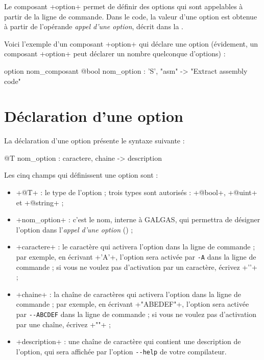 


Le composant \ggs+option+ permet de définir des options qui sont appelables à partir de la ligne de commande. Dans le code, la valeur d'une option est obtenue à partir de l'opérande \emph{appel d'une option}, décrit dans la .

Voici l'exemple d'un composant \ggs+option+ qui déclare une option (évidement, un composant \ggs+option+ peut déclarer un nombre quelconque d'options) :
\begin{galgas}
option nom_composant {
  @bool nom_option : 'S', "asm" -> "Extract assembly code"
}
\end{galgas}


\section{Déclaration d'une option}

La déclaration d'une option présente le syntaxe suivante :
\begin{galgas}
  @T nom_option : caractere, chaine -> description
\end{galgas}

Les cinq champs qui définissent une option sont :
\begin{itemize}
  \item \ggs+@T+ : le type de l'option ; trois types sont autorisés : \ggs+@bool+, \ggs+@uint+ et \ggs+@string+ ;
  \item \ggs+nom_option+ : c'est le nom, interne à GALGAS, qui permettra de désigner l'option dans l'\emph{appel d'une option} () ; 
  \item \ggs+caractere+ : le caractère qui activera l'option dans la ligne de commande ; par exemple, en écrivant \ggs+'A'+, l'option sera activée par \texttt{-A} dans la ligne de commande ; si vous ne voulez pas d'activation par un caractère, écrivez \ggs+'\0'+ ;
  \item \ggs+chaine+ : la chaîne de caractères qui activera l'option dans la ligne de commande ; par exemple, en écrivant \ggs+"ABEDEF"+, l'option sera activée par \texttt{-{}-ABCDEF} dans la ligne de commande ; si vous ne voulez pas d'activation par une chaîne, écrivez \ggs+""+ ;
  \item \ggs+description+ : une chaîne de caractère qui contient une description de l'option, qui sera affichée par l'option \texttt{-{}-help} de votre compilateur.
\end{itemize}








